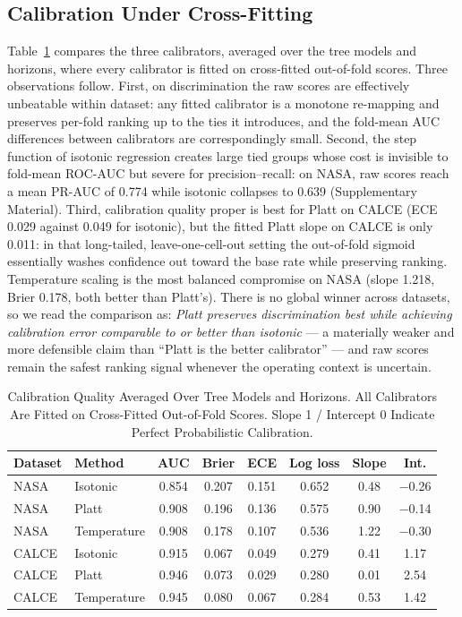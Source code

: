 \documentclass[11pt,a4paper]{article}
\begin{document}
\subsection{Calibration Under Cross-Fitting}
Table~\ref{tab:cal} compares the three calibrators, averaged over the tree models and horizons, where every calibrator is fitted on cross-fitted out-of-fold scores. Three observations follow. First, on discrimination the raw scores are effectively unbeatable within dataset: any fitted calibrator is a monotone re-mapping and preserves per-fold ranking up to the ties it introduces, and the fold-mean AUC differences between calibrators are correspondingly small. Second, the step function of isotonic regression creates large tied groups whose cost is invisible to fold-mean ROC-AUC but severe for precision--recall: on NASA, raw scores reach a mean PR-AUC of 0.774 while isotonic collapses to 0.639 (Supplementary Material). Third, calibration quality proper is best for Platt on CALCE (ECE 0.029 against 0.049 for isotonic), but the fitted Platt slope on CALCE is only 0.011: in that long-tailed, leave-one-cell-out setting the out-of-fold sigmoid essentially washes confidence out toward the base rate while preserving ranking. Temperature scaling is the most balanced compromise on NASA (slope 1.218, Brier 0.178, both better than Platt's). There is no global winner across datasets, so we read the comparison as: \emph{Platt preserves discrimination best while achieving calibration error comparable to or better than isotonic} --- a materially weaker and more defensible claim than ``Platt is the better calibrator'' --- and raw scores remain the safest ranking signal whenever the operating context is uncertain.

\begin{table}[!t]
\caption{Calibration Quality Averaged Over Tree Models and Horizons. All Calibrators Are Fitted on Cross-Fitted Out-of-Fold Scores. Slope 1 / Intercept 0 Indicate Perfect Probabilistic Calibration.}
\label{tab:cal}
\centering
\scriptsize
\begin{tabular}{llcccccc}
\toprule
\textbf{Dataset} & \textbf{Method} & \textbf{AUC} & \textbf{Brier} & \textbf{ECE} & \textbf{Log loss} & \textbf{Slope} & \textbf{Int.}\\
\midrule
NASA & Isotonic & 0.854 & 0.207 & 0.151 & 0.652 & 0.48 & $-$0.26 \\
NASA & Platt & 0.908 & 0.196 & 0.136 & 0.575 & 0.90 & $-$0.14 \\

NASA & Temperature & 0.908 & 0.178 & 0.107 & 0.536 & 1.22 & $-$0.30 \\
CALCE & Isotonic & 0.915 & 0.067 & 0.049 & 0.279 & 0.41 & 1.17 \\
CALCE & Platt & 0.946 & 0.073 & 0.029 & 0.280 & 0.01 & 2.54 \\
CALCE & Temperature & 0.945 & 0.080 & 0.067 & 0.284 & 0.53 & 1.42 \\
\bottomrule
\end{tabular}
\end{table}
\end{document}
